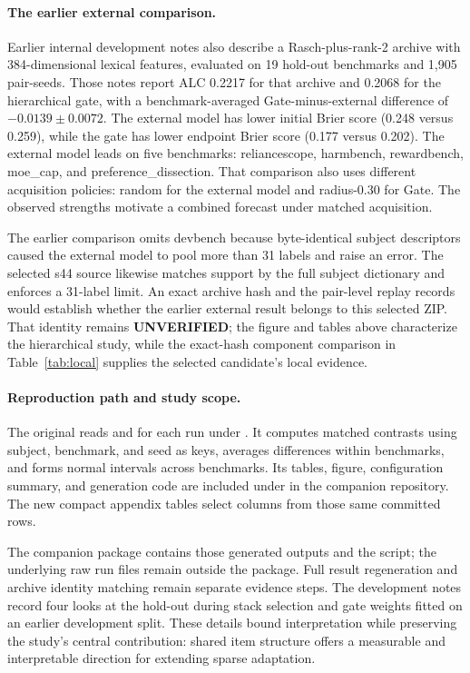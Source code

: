 \paragraph{The earlier external comparison.}
Earlier internal development notes also describe a Rasch-plus-rank-2 archive with 384-dimensional lexical features, evaluated on 19 hold-out benchmarks and 1,905 pair-seeds. Those notes report ALC 0.2217 for that archive and 0.2068 for the hierarchical gate, with a benchmark-averaged Gate-minus-external difference of $-0.0139\pm0.0072$. The external model has lower initial Brier score (0.248 versus 0.259), while the gate has lower endpoint Brier score (0.177 versus 0.202). The external model leads on five benchmarks: reliancescope, harmbench, rewardbench, moe\_cap, and preference\_dissection. That comparison also uses different acquisition policies: random for the external model and radius-0.30 for Gate. The observed strengths motivate a combined forecast under matched acquisition.

The earlier comparison omits devbench because byte-identical subject descriptors caused the external model to pool more than 31 labels and raise an error. The selected s44 source likewise matches support by the full subject dictionary and enforces a 31-label limit. An exact archive hash and the pair-level replay records would establish whether the earlier external result belongs to this selected ZIP. That identity remains \textbf{UNVERIFIED}; the figure and tables above characterize the hierarchical study, while the exact-hash component comparison in Table~\ref{tab:local} supplies the selected candidate's local evidence.

\paragraph{Reproduction path and study scope.}
The original  reads  and  for each run under . It computes matched contrasts using subject, benchmark, and seed as keys, averages differences within benchmarks, and forms normal intervals across benchmarks. Its tables, figure, configuration summary, and generation code are included under  in the companion repository. The new compact appendix tables select columns from those same committed rows.

The companion package contains those generated outputs and the script; the underlying raw run files remain outside the package. Full result regeneration and archive identity matching remain separate evidence steps. The development notes record four looks at the hold-out during stack selection and gate weights fitted on an earlier development split. These details bound interpretation while preserving the study's central contribution: shared item structure offers a measurable and interpretable direction for extending sparse adaptation.
